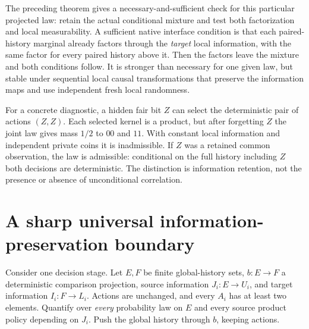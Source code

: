 \documentclass[11pt]{article}
\begin{document}
The preceding theorem gives a necessary-and-sufficient check for this particular projected law: retain the actual conditional mixture and test both factorization and local measurability. A sufficient native interface condition is that each paired-history marginal already factors through the \emph{target} local information, with the same factor for every paired history above it. Then the factors leave the mixture and both conditions follow. It is stronger than necessary for one given law, but stable under sequential local causal transformations that preserve the information maps and use independent fresh local randomness.

For a concrete diagnostic, a hidden fair bit $Z$ can select the deterministic pair of actions $(Z,Z)$. Each selected kernel is a product, but after forgetting $Z$ the joint law gives mass $1/2$ to $00$ and $11$. With constant local information and independent private coins it is inadmissible. If $Z$ was a retained common observation, the law is admissible: conditional on the full history including $Z$ both decisions are deterministic. The distinction is information retention, not the presence or absence of unconditional correlation.

\section{A sharp universal information-preservation boundary}
Consider one decision stage. Let $E,F$ be finite global-history sets, $b:E\to F$ a deterministic comparison projection, source information $J_i:E\to U_i$, and target information $I_i:F\to L_i$. Actions are unchanged, and every $A_i$ has at least two elements. Quantify over \emph{every} probability law on $E$ and every source product policy depending on $J_i$. Push the global history through $b$, keeping actions.
\end{document}
